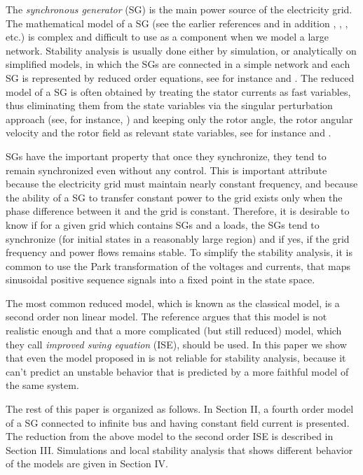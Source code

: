 \documentclass[conference]{IEEEtran}
\begin{document}
The {\em synchronous generator} (SG) is the main power source of the
electricity grid. The mathematical model of a SG (see the earlier
references and in addition \cite{Walker:94}, \cite{Fitzgerald:03},
\cite{MaWe:15}, etc.) is complex and difficult to use as a component
when we model a large network. Stability analysis is usually done
either by simulation, or analytically on simplified models, in which
the SGs are connected in a simple network and each SG is represented
by reduced order equations, see for instance \cite{DoBull:12} and
\cite{PoDoBu:13}. The reduced model of a SG is often obtained by
treating the stator currents as fast variables, thus eliminating them
from the state variables via the singular perturbation approach (see,
for instance, \cite{Khalil}) and keeping only the rotor angle, the
rotor angular velocity and the rotor field as relevant state
variables, see for instance \cite{Kundur} and \cite{SauerPai1998}.

SGs have the important property that once they synchronize, they tend
to remain synchronized even without any control. This is important
attribute because the electricity grid must maintain nearly constant
frequency, and because the ability of a SG to transfer constant power
to the grid exists only when the phase difference between it and the
grid is constant. Therefore, it is desirable to know if for a given
grid which contains SGs and a loads, the SGs tend to synchronize (for
initial states in a reasonably large region) and if yes, if the grid
frequency and power flows remains stable. To simplify the stability
analysis, it is common to use the Park transformation of the voltages
and currents, that maps sinusoidal positive sequence signals into a
fixed point in the state space.

The most common reduced model, which is known as the classical model,
is a second order non linear model. The reference
\cite{DePersiSchaft:16} argues that this model is not realistic enough
and that a more complicated (but still reduced) model, which they call
{\em improved swing equation} (ISE), should be used. In this paper we
show that even the model proposed in \cite{DePersiSchaft:16} is not
reliable for stability analysis, because it can't predict an unstable
behavior that is predicted by a more faithful model of the same
system.

The rest of this paper is organized as follows. In Section II, a
fourth order model of a SG connected to infinite bus and having
constant field current is presented. The reduction from the above
model to the second order ISE is described in Section III.
Simulations and local stability analysis that shows different behavior
of the models are given in Section IV.
\end{document}
